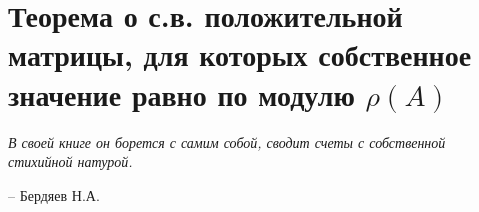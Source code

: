 \chapter{Теорема о с.в. положительной матрицы, для которых
собственное значение равно по модулю $\rho(A)$}
\label{cha:29}

\epigraph{
	\textit{В своей книге он борется с самим собой, сводит счеты с собственной стихийной натурой.}}
{-- Бердяев Н.А.}



	


